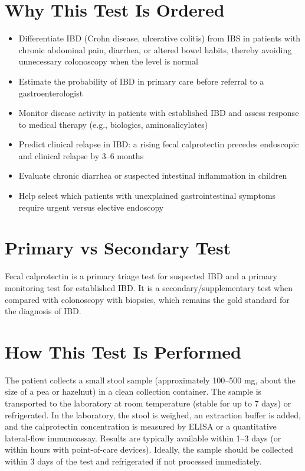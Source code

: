 \section*{Why This Test Is Ordered}
\begin{itemize}
  \item Differentiate IBD (Crohn disease, ulcerative colitis) from IBS in patients with chronic abdominal pain, diarrhea, or altered bowel habits, thereby avoiding unnecessary colonoscopy when the level is normal
  \item Estimate the probability of IBD in primary care before referral to a gastroenterologist
  \item Monitor disease activity in patients with established IBD and assess response to medical therapy (e.g., biologics, aminosalicylates)
  \item Predict clinical relapse in IBD: a rising fecal calprotectin precedes endoscopic and clinical relapse by 3--6 months \cite{dhaens2012}
  \item Evaluate chronic diarrhea or suspected intestinal inflammation in children
  \item Help select which patients with unexplained gastrointestinal symptoms require urgent versus elective endoscopy
\end{itemize}

\section*{Primary vs Secondary Test}
Fecal calprotectin is a primary triage test for suspected IBD and a primary monitoring test for established IBD. It is a secondary/supplementary test when compared with colonoscopy with biopsies, which remains the gold standard for the diagnosis of IBD.

\section*{How This Test Is Performed}
The patient collects a small stool sample (approximately 100--500 mg, about the size of a pea or hazelnut) in a clean collection container. The sample is transported to the laboratory at room temperature (stable for up to 7 days) or refrigerated. In the laboratory, the stool is weighed, an extraction buffer is added, and the calprotectin concentration is measured by ELISA or a quantitative lateral-flow immunoassay. Results are typically available within 1--3 days (or within hours with point-of-care devices). Ideally, the sample should be collected within 3 days of the test and refrigerated if not processed immediately.

